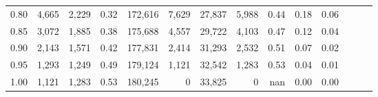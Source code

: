 \begin{tabular}{rrrrrrrrrrrrrr}
0.80 &   4,665 &  2,229 &  0.32 &  172,616 &    7,629 &  27,837 &   5,988 &  0.44 &  0.18 &      0.06 \\
0.85 &   3,072 &  1,885 &  0.38 &  175,688 &    4,557 &  29,722 &   4,103 &  0.47 &  0.12 &      0.04 \\
0.90 &   2,143 &  1,571 &  0.42 &  177,831 &    2,414 &  31,293 &   2,532 &  0.51 &  0.07 &      0.02 \\
0.95 &   1,293 &  1,249 &  0.49 &  179,124 &    1,121 &  32,542 &   1,283 &  0.53 &  0.04 &      0.01 \\
1.00 &   1,121 &  1,283 &  0.53 &  180,245 &        0 &  33,825 &       0 &   nan &  0.00 &      0.00 \\
\bottomrule
\end{tabular}
